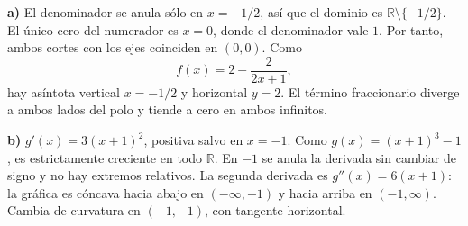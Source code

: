 \textbf{a)} El denominador se anula sólo en $x=-1/2$, así que el dominio es $\mathbb R\setminus\{-1/2\}$. El único cero del numerador es $x=0$, donde el denominador vale $1$. Por tanto, ambos cortes con los ejes coinciden en $(0,0)$. Como
\[
f(x)=2-\frac{2}{2x+1},
\]
hay asíntota vertical $x=-1/2$ y horizontal $y=2$. El término fraccionario diverge a ambos lados del polo y tiende a cero en ambos infinitos.

\textbf{b)} $g'(x)=3(x+1)^2$, positiva salvo en $x=-1$. Como $g(x)=(x+1)^3-1$, es estrictamente creciente en todo $\mathbb R$. En $-1$ se anula la derivada sin cambiar de signo y no hay extremos relativos. La segunda derivada es $g''(x)=6(x+1)$: la gráfica es cóncava hacia abajo en $(-\infty,-1)$ y hacia arriba en $(-1,\infty)$. Cambia de curvatura en $\boxed{(-1,-1)}$, con tangente horizontal.
